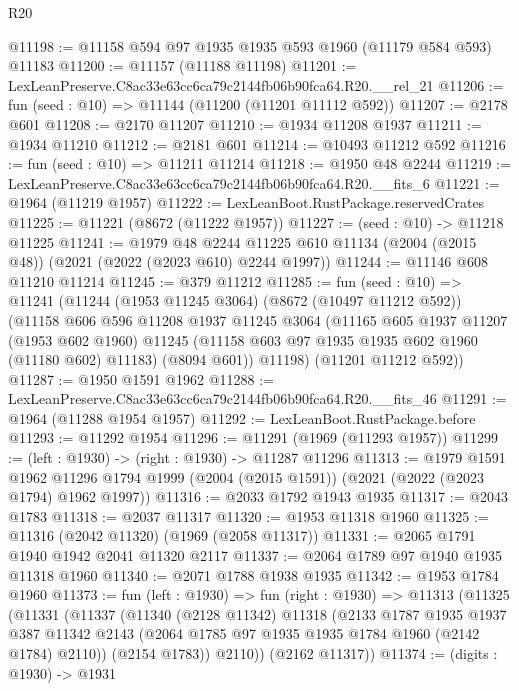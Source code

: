 \begin{lexlean}{R20}
\begin{coremodule}
@11198 := @11158 @594 @97 @1935 @1935 @593 @1960 (@11179 @584 @593) @11183
@11200 := @11157 (@11188 @11198)
@11201 := LexLeanPreserve.C8ac33e63cc6ca79c2144fb06b90fca64.R20.__rel_21
@11206 := fun (seed : @10) => @11144 (@11200 (@11201 @11112 @592))
@11207 := @2178 @601
@11208 := @2170 @11207
@11210 := @1934 @11208 @1937
@11211 := @1934 @11210
@11212 := @2181 @601
@11214 := @10493 @11212 @592
@11216 := fun (seed : @10) => @11211 @11214
@11218 := @1950 @48 @2244
@11219 := LexLeanPreserve.C8ac33e63cc6ca79c2144fb06b90fca64.R20.__fits_6
@11221 := @1964 (@11219 @1957)
@11222 := LexLeanBoot.RustPackage.reservedCrates
@11225 := @11221 (@8672 (@11222 @1957))
@11227 := (seed : @10) -> @11218 @11225
@11241 := @1979
    @48
    @2244
    @11225
    @610
    @11134
    (@2004 (@2015 @48))
    (@2021 (@2022 (@2023 @610) @2244 @1997))
@11244 := @11146 @608 @11210 @11214
@11245 := @379 @11212
@11285 := fun (seed : @10) =>
  @11241
    (@11244
      (@1953 @11245 @3064)
      (@8672 (@10497 @11212 @592))
      (@11158
        @606
        @596
        @11208
        @1937
        @11245
        @3064
        (@11165
          @605
          @1937
          @11207
          (@1953 @602 @1960)
          @11245
          (@11158 @603 @97 @1935 @1935 @602 @1960 (@11180 @602) @11183)
          (@8094 @601))
        @11198)
      (@11201 @11212 @592))
@11287 := @1950 @1591 @1962
@11288 := LexLeanPreserve.C8ac33e63cc6ca79c2144fb06b90fca64.R20.__fits_46
@11291 := @1964 (@11288 @1954 @1957)
@11292 := LexLeanBoot.RustPackage.before
@11293 := @11292 @1954
@11296 := @11291 (@1969 (@11293 @1957))
@11299 := (left : @1930) -> (right : @1930) -> @11287 @11296
@11313 := @1979
    @1591
    @1962
    @11296
    @1794
    @1999
    (@2004 (@2015 @1591))
    (@2021 (@2022 (@2023 @1794) @1962 @1997))
@11316 := @2033 @1792 @1943 @1935
@11317 := @2043 @1783
@11318 := @2037 @11317
@11320 := @1953 @11318 @1960
@11325 := @11316 (@2042 @11320) (@1969 (@2058 @11317))
@11331 := @2065 @1791 @1940 @1942 @2041 @11320 @2117
@11337 := @2064 @1789 @97 @1940 @1935 @11318 @1960
@11340 := @2071 @1788 @1938 @1935
@11342 := @1953 @1784 @1960
@11373 := fun (left : @1930) =>
  fun (right : @1930) =>
  @11313
    (@11325
      (@11331
        (@11337
          (@11340
            (@2128 @11342)
            @11318
            (@2133
              @1787
              @1935
              @1937
              @387
              @11342
              @2143
              (@2064 @1785 @97 @1935 @1935 @1784 @1960 (@2142 @1784) @2110))
            (@2154 @1783))
          @2110))
      (@2162 @11317))
@11374 := (digits : @1930) -> @1931

\end{coremodule}
\end{lexlean}

